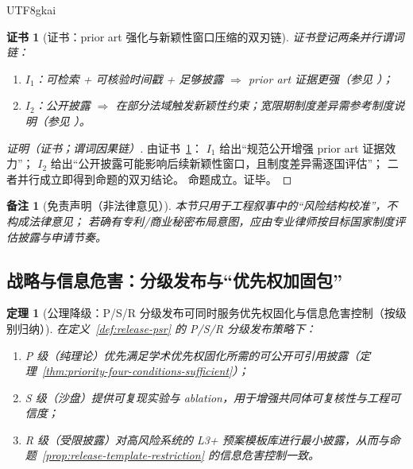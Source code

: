 \documentclass[12pt]{article}
\newtheorem{theorem}{定理}[section]
\newtheorem{remark}{备注}[section]
\newtheorem{Certificate}{证书}[section]
\begin{document}
\begin{CJK*}{UTF8}{gkai}
\begin{Certificate}[证书：prior art 强化与新颖性窗口压缩的双刃链]
\label{cert:prior-art-and-window-tradeoff}
证书登记两条并行谓词链：
\begin{enumerate}
  \item $I_1$：可检索 + 可核验时间戳 + 足够披露 $\Rightarrow$ prior art 证据更强（参见 \cite{ref_perkinscoie_prior_art}）；
  \item $I_2$：公开披露 $\Rightarrow$ 在部分法域触发新颖性约束；宽限期制度差异需参考制度说明（参见 \cite{ref_wipo_patent_protection,ref_uspto_mpep_2153,
    ref_cnipa_patent_law}）。
\end{enumerate}
\end{Certificate}

\begin{proof}[证明（证书；谓词因果链）]
由证书~\ref{cert:prior-art-and-window-tradeoff}：
$I_1$ 给出“规范公开增强 prior art 证据效力”；
$I_2$ 给出“公开披露可能影响后续新颖性窗口，且制度差异需逐国评估”；
二者并行成立即得到命题的双刃结论。
命题成立。证毕。
\end{proof}

\begin{remark}[免责声明（非法律意见）]
本节只用于工程叙事中的“风险结构校准”，不构成法律意见；
若确有专利/商业秘密布局意图，应由专业律师按目标国家制度评估披露与申请节奏。
\end{remark}

\subsection{战略与信息危害：分级发布与“优先权加固包”}
\label{sec:priority-release-and-pack}

\begin{theorem}[公理降级：P/S/R 分级发布可同时服务优先权固化与信息危害控制（按级别归纳）]
\label{thm:release-psr-serves-both}
在定义~\ref{def:release-psr} 的 P/S/R 分级发布策略下：
\begin{enumerate}
  \item P 级（纯理论）优先满足学术优先权固化所需的可公开可引用披露（定理~\ref{thm:priority-four-conditions-sufficient}）；
  \item S 级（沙盘）提供可复现实验与 ablation，用于增强共同体可复核性与工程可信度；
  \item R 级（受限披露）对高风险系统的 L3+ 预案模板库进行最小披露，从而与命题~\ref{prop:release-template-restriction} 的信息危害控制一致。
\end{enumerate}
\end{theorem}


\end{CJK*}
\end{document}
